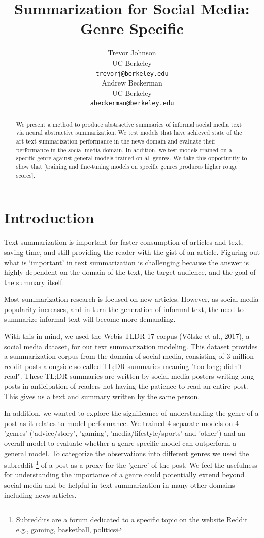 \documentclass[11pt,a4paper, twocolumn]{article}
\title{Summarization for Social Media: Genre Specific}
\author{Trevor Johnson \\
  UC Berkeley  \\
  \texttt{trevorj@berkeley.edu} \\\And
  Andrew Beckerman \\
  UC Berkeley \\
  \texttt{abeckerman@berkeley.edu} \\}
\date{}
\begin{document}
\maketitle
\begin{abstract}

We present a method to produce abstractive summaries of informal social media text via neural abstractive summarization. We test models that have achieved state of the art text summarization performance in the news domain and evaluate their performance in the social media domain.
In addition, we test models trained on a specific genre against general models trained on all genres. We take this opportunity to show that [training and fine-tuning models on specific genres produces higher rouge scores].

\end{abstract}

\section{Introduction}

Text summarization is important for faster consumption of articles and text, saving time, and still providing the reader with the gist of an article. Figuring out what is ‘important’ in text summarization is challenging because the answer is highly dependent on the domain of the text, the target audience, and the goal of the summary itself.

Most summarization research is focused on new articles. However, as social media popularity increases, and in turn the generation of informal text, the need to summarize informal text will become more demanding.

With this in mind, we used the Webis-TLDR-17 corpus (Völske et al., 2017), a social media dataset, for our text summarization modeling. This dataset provides a summarization corpus from the domain of social media, consisting of 3 million reddit posts alongside so-called TL;DR summaries meaning "too long; didn't read".  These TL;DR summaries are written by social media posters writing long posts in anticipation of readers not having the patience to read an entire post. This gives us a text and summary written by the same person.

In addition, we wanted to explore the significance of understanding the genre of a post as it relates to model performance. We trained 4 separate models on 4 'genres' ('advice/story', 'gaming', 'media/lifestyle/sports' and 'other') and an overall model to evaluate whether a genre specific model can outperform a general model. To categorize the observations into different genres we used the subreddit \footnote{Subreddits are a forum dedicated to a specific topic on the website Reddit e.g., gaming, basketball, politics} of a post as a proxy for the 'genre' of the post. We feel the usefulness for understanding the importance of a genre could potentially extend beyond social media and be helpful in text summarization in many other domains including news articles.
\end{document}

